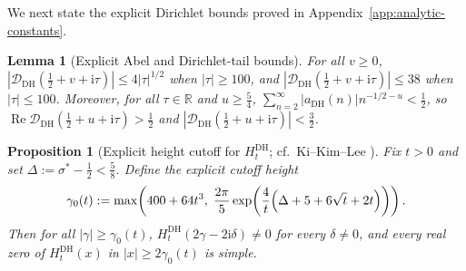 \documentclass[11pt,a4paper,reqno]{amsart}
\newtheorem{proposition}[theorem]{Proposition}
\newtheorem{lemma}[theorem]{Lemma}
\theoremstyle{definition}
\theoremstyle{remark}
\numberwithin{equation}{section}
\newcommand{\R}{\mathbb{R}}
\newcommand{\ii}{\mathrm{i}}
\DeclareMathOperator{\Reop}{Re}
\begin{document}
We next state the explicit Dirichlet bounds proved in Appendix~\ref{app:analytic-constants}.

\begin{lemma}[Explicit Abel and Dirichlet-tail bounds]
\label{lem:abel-dirichlet}
For all $v \ge 0$, $|\mathcal{D}_{\mathrm{DH}}(\frac{1}{2} + v + \ii\tau)| \le 4|\tau|^{1/2}$ when $|\tau| \ge 100$, and $|\mathcal{D}_{\mathrm{DH}}(\frac{1}{2} + v + \ii\tau)| \le 38$ when $|\tau| \le 100$. Moreover, for all $\tau \in \R$ and $u \ge \frac{5}{4}$, $\sum_{n=2}^{\infty} |a_{\mathrm{DH}}(n)|n^{-1/2 - u} < \frac{1}{2}$, so $\Reop\mathcal{D}_{\mathrm{DH}}(\frac{1}{2} + u + \ii\tau) > \frac{1}{2}$ and $|\mathcal{D}_{\mathrm{DH}}(\frac{1}{2} + u + \ii\tau)| < \frac{3}{2}$.
\end{lemma}

\begin{proposition}[Explicit height cutoff for $H_t^{\mathrm{DH}}$; cf.\ Ki--Kim--Lee \cite{kikimlee2009}]
\label{prop:asymptotic-simplicity}
Fix $t > 0$ and set $\Delta := \sigma^* - \frac{1}{2} < \frac{5}{8}$. Define the explicit cutoff height
\begin{equation}
  \gamma_0(t) := \max\!\left(400 + 64t^3,\; \frac{2\pi}{5}\exp\!\left(\frac{4}{t}\Bigl(\Delta + 5 + 6\sqrt{t} + 2t\Bigr)\right)\right).
  \label{eq:gamma0-cutoff}
\end{equation}
Then for all $|\gamma| \ge \gamma_0(t)$, $H_t^{\mathrm{DH}}(2\gamma - 2\ii\delta) \ne 0$ for every $\delta \ne 0$, and every real zero of $H_t^{\mathrm{DH}}(x)$ in $|x| \ge 2\gamma_0(t)$ is simple.
\end{proposition}
\end{document}
